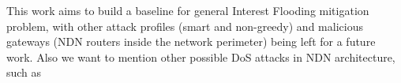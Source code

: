 This work aims to build a baseline for general Interest Flooding mitigation problem, with other attack profiles (smart and non-greedy) and malicious gateways (NDN routers inside the network perimeter) being left for a future work. Also we want to mention other possible DoS attacks in NDN architecture, such as 







